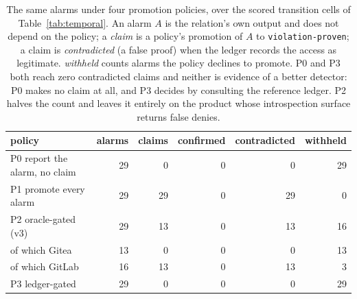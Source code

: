 \begin{table}[t]
\centering
\caption{The same \PolAlarms{} alarms under four promotion policies, over the \PolCells{} scored transition cells of Table~\ref{tab:temporal}. An alarm $A$ is the relation's own output and does not depend on the policy; a \emph{claim} is a policy's promotion of $A$ to \texttt{violation-proven}; a claim is \emph{contradicted} (a false proof) when the ledger records the access as legitimate. \emph{withheld} counts alarms the policy declines to promote. P0 and P3 both reach zero contradicted claims and neither is evidence of a better detector: P0 makes no claim at all, and P3 decides by consulting the reference ledger. P2 halves the count and leaves it entirely on the product whose introspection surface returns false denies.}
\label{tab:promotion}
\small
\begin{tabular}{lrrrrr}
\toprule
policy & alarms & claims & confirmed & contradicted & withheld \\
\midrule
P0 report the alarm, no claim & 29 & 0 & 0 & 0 & 29 \\
P1 promote every alarm & 29 & 29 & 0 & 29 & 0 \\
P2 oracle-gated (v3) & 29 & 13 & 0 & 13 & 16 \\
\quad of which Gitea & 13 & 0 & 0 & 0 & 13 \\
\quad of which GitLab & 16 & 13 & 0 & 13 & 3 \\
\midrule
P3 ledger-gated & 29 & 0 & 0 & 0 & 29 \\
\bottomrule
\end{tabular}
\end{table}

